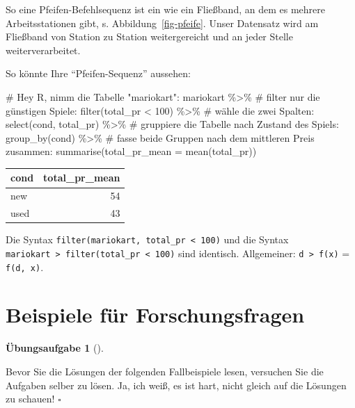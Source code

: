 \documentclass[
  letterpaper,
]{scrbook}
\newenvironment{Shaded}{\begin{snugshade}}{\end{snugshade}}
\newcommand{\AttributeTok}[1]{\textcolor[rgb]{0.40,0.45,0.13}{#1}}
\newcommand{\CommentTok}[1]{\textcolor[rgb]{0.37,0.37,0.37}{#1}}
\newcommand{\DecValTok}[1]{\textcolor[rgb]{0.68,0.00,0.00}{#1}}
\newcommand{\FunctionTok}[1]{\textcolor[rgb]{0.28,0.35,0.67}{#1}}
\newcommand{\NormalTok}[1]{\textcolor[rgb]{0.00,0.23,0.31}{#1}}
\newcommand{\SpecialCharTok}[1]{\textcolor[rgb]{0.37,0.37,0.37}{#1}}
\theoremstyle{definition}
\newtheorem{exercise}{Übungsaufgabe}[chapter]
\theoremstyle{definition}
\theoremstyle{definition}
\theoremstyle{remark}
\begin{document}
So eine Pfeifen-Befehlsequenz ist ein wie ein Fließband, an dem es
mehrere Arbeitsstationen gibt, s. Abbildung~\ref{fig-pfeife}. Unser
Datensatz wird am Fließband von Station zu Station weitergereicht und an
jeder Stelle weiterverarbeitet.

So könnte Ihre \enquote{Pfeifen-Sequenz} aussehen:

\begin{Shaded}
\begin{Highlighting}[]
\CommentTok{\# Hey R, nimm die Tabelle "mariokart":}
\NormalTok{mariokart }\SpecialCharTok{\%\textgreater{}\%}  
   \CommentTok{\# filter nur die günstigen Spiele:}
  \FunctionTok{filter}\NormalTok{(total\_pr }\SpecialCharTok{\textless{}} \DecValTok{100}\NormalTok{) }\SpecialCharTok{\%\textgreater{}\%} 
  \CommentTok{\# wähle die zwei Spalten:}
  \FunctionTok{select}\NormalTok{(cond, total\_pr) }\SpecialCharTok{\%\textgreater{}\%}  
  \CommentTok{\# gruppiere die Tabelle nach Zustand des Spiels:}
  \FunctionTok{group\_by}\NormalTok{(cond) }\SpecialCharTok{\%\textgreater{}\%}  
  \CommentTok{\# fasse beide Gruppen nach dem mittleren Preis zusammen:}
  \FunctionTok{summarise}\NormalTok{(}\AttributeTok{total\_pr\_mean =} \FunctionTok{mean}\NormalTok{(total\_pr))  }
\end{Highlighting}
\end{Shaded}

\begin{longtable}[]{@{}lr@{}}
\toprule\noalign{}
cond & total\_pr\_mean \\
\midrule\noalign{}
\endhead
\bottomrule\noalign{}
\endlastfoot
new & 54 \\
used & 43 \\
\end{longtable}

Die Syntax \texttt{filter(mariokart,\ total\_pr\ \textless{}\ 100)} und
die Syntax
\texttt{mariokart\ \textbar{}\textgreater{}\ filter(total\_pr\ \textless{}\ 100)}
sind identisch. Allgemeiner: \texttt{d\ \textbar{}\textgreater{}\ f(x)}
= \texttt{f(d,\ x)}.

\section{Beispiele für
Forschungsfragen}\label{beispiele-fuxfcr-forschungsfragen}

\begin{exercise}[]\protect\hypertarget{exr-fallbsps}{}\label{exr-fallbsps}

Bevor Sie die Lösungen der folgenden Fallbeispiele lesen, versuchen Sie
die Aufgaben selber zu lösen. Ja, ich weiß, es ist hart, nicht gleich
auf die Lösungen zu schauen! \(\square\)

\end{exercise}
\end{document}

